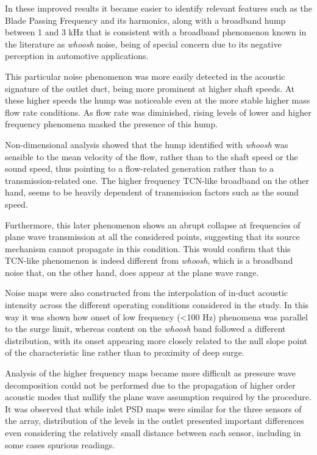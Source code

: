 In these improved results it became easier to identify relevant features such as the Blade Passing Frequency and its harmonics, along with a broadband hump between 1 and 3 kHz that is consistent with a broadband phenomenon known in the literature as \emph{whoosh} noise, being of special concern due to its negative perception in automotive applications.

This particular noise phenomenon was more easily detected in the acoustic signature of the outlet duct, being more prominent at higher shaft speeds. At these higher speeds the hump was noticeable even at the more stable higher mass flow rate conditions. As flow rate was diminished, rising levels of lower and higher frequency phenomena masked the presence of this hump. 

Non-dimensional analysis showed that the hump identified with \emph{whoosh} was sensible to the mean velocity of the flow, rather than to the shaft speed or the sound speed, thus pointing to a flow-related generation rather than to a transmission-related one. The higher frequency TCN-like broadband on the other hand, seems to be heavily dependent of transmission factors such as the sound speed. 

Furthermore, this later phenomenon shows an abrupt collapse at frequencies of plane wave transmission at all the considered points, suggesting that its source mechanism cannot propagate in this condition. This would confirm that this TCN-like phenomenon is indeed different from \emph{whoosh}, which is a broadband noise that, on the other hand, does appear at the plane wave range.

Noise maps were also constructed from the interpolation of in-duct acoustic intensity across the different operating conditions considered in the study. In this way it was shown how onset of low frequency (<100 Hz) phenomena was parallel to the surge limit, whereas content on the \emph{whoosh} band followed a different distribution, with its onset appearing more closely related to the null slope point of the characteristic line rather than to proximity of deep surge.

Analysis of the higher frequency maps became more difficult as pressure wave decomposition could not be performed due to the propagation of higher order acoustic modes that nullify the plane wave assumption required by the procedure. It was observed that while inlet PSD maps were similar for the three sensors of the array, distribution of the levels in the outlet presented important differences even considering the relatively small distance between each sensor, including in some cases spurious readings. 

